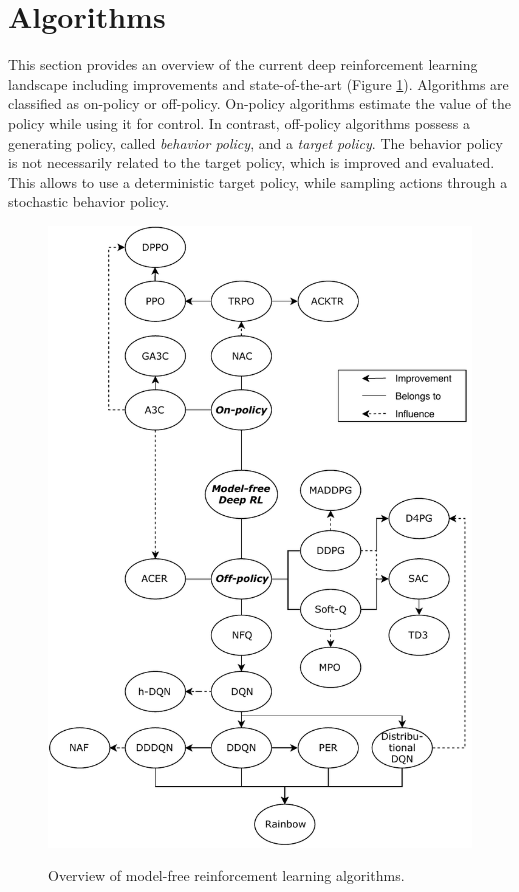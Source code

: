     \section{Algorithms \label{sec:algorithms}}
	This section provides an overview of the current deep reinforcement learning landscape including improvements and state-of-the-art (Figure \ref{fig:overview}). 
	Algorithms are classified as on-policy or off-policy.
	On-policy algorithms estimate the value of the policy while using it for control.
	In contrast, off-policy algorithms possess a generating policy, called \textit{behavior policy}, and a \textit{target policy}.
	The behavior policy is not necessarily related to the target policy, which is improved and evaluated.
	This allows to use a deterministic target policy, while sampling actions through a stochastic behavior policy. \cite[chapter 5]{Sutton2018}
	\begin{figure}[!t]
		\centering
		\includegraphics[height=.75\textheight]{images/tree3.pdf}
		\label{fig:overview}
		\caption{Overview of model-free reinforcement learning algorithms.}
	\end{figure}
		

